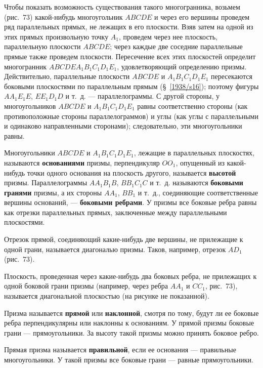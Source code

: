 \documentclass[twoside]{book}
\begin{document}
Чтобы показать возможность существования такого многогранника, возьмем (рис.~73) какой-нибудь многоугольник $ABCDE$ и через его вершины проведем ряд параллельных прямых, не лежащих в его плоскости.
Взяв затем на одной из этих прямых произвольную точку $A_1$, проведем через нее плоскость, параллельную плоскости $ABCDE$;
через каждые две соседние параллельные прямые также проведем плоскости. %
Пересечение всех этих плоскостей определит многогранник $ABCDEA_1B_1C_1D_1E_1$, удовлетворяющий определению призмы. %
Действительно, параллельные плоскости $ABCDE$ и $A_1B_1C_1D_1E_1$ пересекаются боковыми плоскостями по параллельным прямым (§~\ref{1938/s16});
поэтому фигуры $AA_1E_1E$, $EE_1D_1D$ и т.~д. --- параллелограммы.
С другой стороны, у многоугольников $ABCDE$ и $A_1B_1C_1D_1E_1$ равны соответственно стороны (как противоположные стороны параллелограммов) и углы (как углы с параллельными и одинаково направленными сторонами);
следовательно, эти многоугольники равны. %

Многоугольники $ABCDE$ и $A_1B_1C_1D_1E_1$, лежащие в параллельных плоскостях, называются \textbf{основаниями} призмы, перпендикуляр $OO_1$, опущенный из какой-нибудь точки одного основания на плоскость другого, называется \textbf{высотой} призмы.
Параллелограммы $AA_1B_1B$, $BB_1C_1C$ и т.~д. называются \textbf{боковыми гранями} призмы, а их стороны $AA_1$, $BB_1$ и т.~д., соединяющие соответственные вершины оснований, --- \textbf{боковыми ребрами}.
У призмы все боковые ребра равны как отрезки параллельных прямых, заключенные между параллельными плоскостями.

Отрезок прямой, соединяющий какие-нибудь две вершины, не прилежащие к одной грани, называется диагональю призмы.
Таков, например, отрезок $AD_1$ (рис.~73).

Плоскость, проведенная через какие-нибудь два боковых ребра, не прилежащих к одной боковой грани призмы (например, через ребра $AA_1$ и $CC_1$, рис.~73), называется диагональной плоскостью (на рисунке не показанной).

Призма называется \textbf{прямой} или \textbf{наклонной}, смотря по тому, будут ли ее боковые ребра перпендикулярны или наклонны к основаниям.
У прямой призмы боковые грани --- прямоугольники.
За высоту такой призмы можно принять боковое ребро.

Прямая призма называется \textbf{правильной}, если ее основания --- правильные многоугольники.
У такой призмы все боковые грани --- равные прямоугольники.
\end{document}
